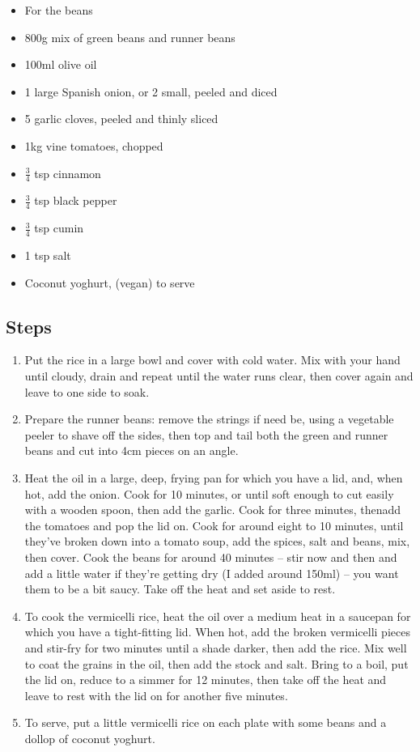 \documentclass{book}
\begin{document}
\begin{itemize}
\item For the beans
\item 800g mix of green beans and runner beans
\item 100ml olive oil
\item 1 large Spanish onion, or 2 small, peeled and diced
\item 5 garlic cloves, peeled and thinly sliced
\item 1kg vine tomatoes, chopped 
\item $\frac{3}{4}$ tsp cinnamon
\item $\frac{3}{4}$ tsp black pepper
\item $\frac{3}{4}$ tsp cumin 
\item 1 tsp salt
\item Coconut yoghurt, (vegan) to serve
\end{itemize}

\subsection*{Steps}
\begin{enumerate}
\item Put the rice in a large bowl and cover with cold water. Mix with your hand until cloudy, drain and repeat until the water runs clear, then cover again and leave to one side to soak.
\item Prepare the runner beans: remove the strings if need be, using a vegetable peeler to shave off the sides, then top and tail both the green and runner beans and cut into 4cm pieces on an angle.
\item Heat the oil in a large, deep, frying pan for which you have a lid, and, when hot, add the onion. Cook for 10 minutes, or until soft enough to cut easily with a wooden spoon, then add the garlic. Cook for three minutes, thenadd the tomatoes and pop the lid on. Cook for around eight to 10 minutes, until they’ve broken down into a tomato soup, add the spices, salt and beans, mix, then cover. Cook the beans for around 40 minutes – stir now and then and add a little water if they’re getting dry (I added around 150ml) – you want them to be a bit saucy. Take off the heat and set aside to rest.
\item To cook the vermicelli rice, heat the oil over a medium heat in a saucepan for which you have a tight-fitting lid. When hot, add the broken vermicelli pieces and stir-fry for two minutes until a shade darker, then add the rice. Mix well to coat the grains in the oil, then add the stock and salt. Bring to a boil, put the lid on, reduce to a simmer for 12 minutes, then take off the heat and leave to rest with the lid on for another five minutes.
\item To serve, put a little vermicelli rice on each plate with some beans and a dollop of coconut yoghurt.
\end{enumerate}
\newpage
\end{document}
